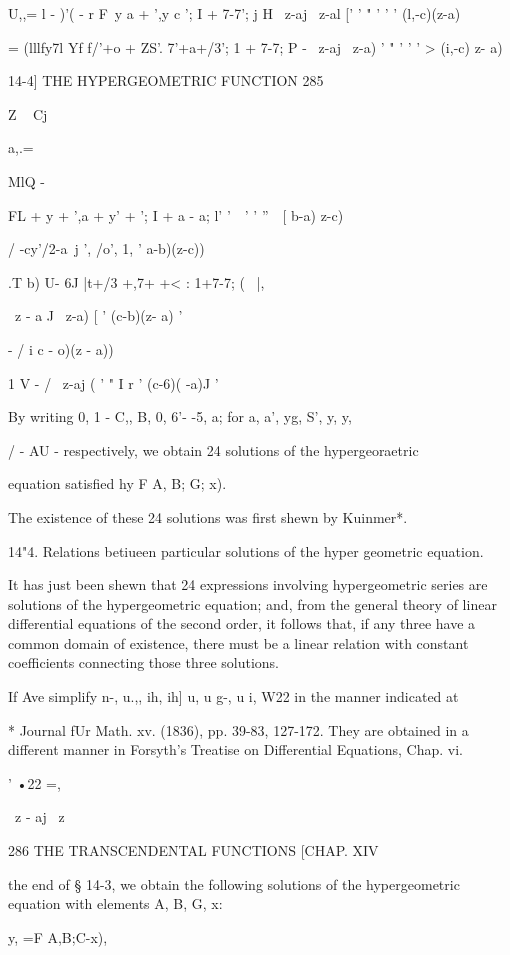 U,,= l - )'( - r F\ y a + ',y c '; I + 7-7'; j H \ z-aj \ z-al [' ' "
' ' ' (l,-c)(z-a)\

   = (lllfy7l Yf f/'+o + ZS'. 7'+a+/3'; 1 + 7-7; P - \ z-aj \ z-a) ' "
' ' ' > (i,-c) z- a)

14-4] THE HYPERGEOMETRIC FUNCTION 285

Z ~ Cj

a,.=

MlQ -

FL + y + ',a + y' + '; I + a - a; l' '\ \ ' ' ''\ \, [ b-a) z-c)

/ -cy'/2-a\ j ', /o', 1, ' a-b)(z-c))

.T b) U- 6J |t+/3 +,7+ +< : 1+7-7; \;( \ |,

\ z - a J \ z-a) [ ' (c-b)(z- a) '

- / i c - o)(z - a))

1 V - / \ z-aj ( ' " I r ' (c-6)( -a)J '

By writing 0, 1 - C,, B, 0, 6'- -5, a; for a, a', yg, S', y, y,

/ - AU - respectively, we obtain 24 solutions of the hypergeoraetric

equation satisfied hy F A, B; G; x).

The existence of these 24 solutions was first shewn by Kuinmer*.

14"4. Relations betiueen particular solutions of the hyper geometric
equation.

It has just been shewn that 24 expressions involving hypergeometric
series are solutions of the hypergeometric equation; and, from the
general theory of linear differential equations of the second order,
it follows that, if any three have a common domain of existence, there
must be a linear relation with constant coefficients connecting those
three solutions.

If Ave simplify n-, u.,, ih, ih] u, u g-, u i, W22 in the manner
indicated at

* Journal fUr Math. xv. (1836), pp. 39-83, 127-172. They are obtained
in a different manner in Forsyth's Treatise on Differential Equations,
Chap. vi.

' •22 =,

\ z - aj \ z

286 THE TRANSCENDENTAL FUNCTIONS [CHAP. XIV

the end of § 14-3, we obtain the following solutions of the
hypergeometric equation with elements A, B, G, x:

y, =F A,B;C-x),

